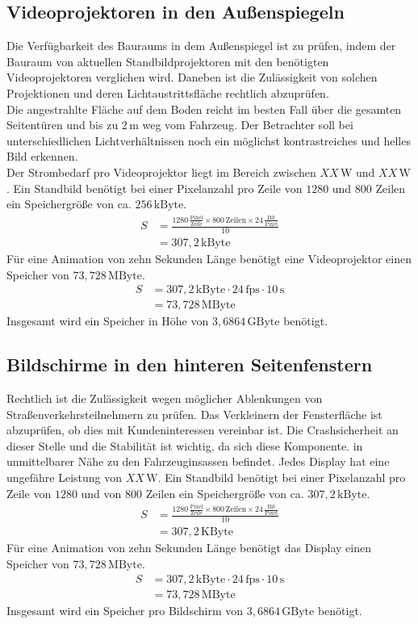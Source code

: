 \subsection{Videoprojektoren in den Außenspiegeln}
Die Verfügbarkeit des Bauraums in dem Außenspiegel ist zu prüfen, indem der Bauraum von aktuellen Standbildprojektoren mit den benötigten Videoprojektoren verglichen wird. 
Daneben ist die Zulässigkeit von solchen Projektionen und deren Lichtaustrittsfläche rechtlich abzuprüfen. \\
Die angestrahlte Fläche auf dem Boden reicht im besten Fall über die gesamten Seitentüren und bis zu $ 2\,\mathrm{m} $ weg vom Fahrzeug.
Der Betrachter soll bei unterschiedlichen Lichtverhältnissen noch ein möglichst kontrastreiches und helles Bild erkennen. \\
Der Strombedarf pro Videoprojektor liegt im Bereich zwischen $ XX\,\mathrm{W} $ und $ XX\,\mathrm{W} $.
Ein Standbild benötigt bei einer Pixelanzahl pro Zeile von $ 1280 $ und $ 800 $ Zeilen ein Speichergröße von ca. $ 256\,\mathrm{kByte}$. 
\begin{align}
	S &= \frac{1280\,\frac{\mathrm{Pixel}}{\mathrm{Zeile}} \times 800\,\mathrm{Zeilen} \times 24\,\frac{\mathrm{Bit}}{\mathrm{Pixel}}}{10} \\
	&= 307,2\,\mathrm{kByte}
\end{align}
Für eine Animation von zehn Sekunden Länge benötigt eine Videoprojektor einen Speicher von $ 73,728\,\mathrm{MByte}$.
\begin{align}
	S &= 307,2\,\mathrm{kByte} \cdot 24\,\mathrm{fps} \cdot 10\,\mathrm{s}\\
	&= 73,728\,\mathrm{MByte} 
\end{align}
Insgesamt wird ein Speicher in Höhe von $ 3,6864\,\mathrm{GByte} $ benötigt.
\subsection{Bildschirme in den hinteren Seitenfenstern}
Rechtlich ist die Zulässigkeit wegen möglicher Ablenkungen von Straßenverkehrsteilnehmern zu prüfen.
Das Verkleinern der Fensterfläche ist abzuprüfen, ob dies mit Kundeninteressen vereinbar ist.
Die Crashsicherheit an dieser Stelle und die Stabilität ist wichtig, da sich diese Komponente. in unmittelbarer Nähe zu den Fahrzeuginsassen befindet.
Jedes Display hat eine ungefähre Leistung von $ XX\,\mathrm{W} $. 
Ein Standbild benötigt bei einer Pixelanzahl pro Zeile von $ 1280 $ und von $ 800 $ Zeilen ein Speichergröße von ca. $ 307,2\,\mathrm{kByte}$. 
\begin{align}
	S &= \frac{1280\,\frac{\mathrm{Pixel}}{\mathrm{Zeile}}\times 800\,\mathrm{Zeilen} \times 24\,\frac{\mathrm{Bit}}{\mathrm{Pixel}}}{10} \\
	&= 307,2\,\mathrm{KByte}
\end{align}
Für eine Animation von zehn Sekunden Länge benötigt das Display einen Speicher von $ 73,728\,\mathrm{MByte}$.
\begin{align}
	S &= 307,2\,\mathrm{kByte} \cdot 24\,\mathrm{fps} \cdot 10\,\mathrm{s}\\
	&= 73,728\,\mathrm{MByte}
\end{align}
Insgesamt wird ein Speicher pro Bildschirm von $ 3,6864\,\mathrm{GByte} $ benötigt.
